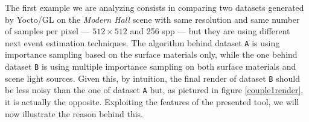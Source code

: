 The first example we are analyzing consists in comparing two datasets generated by Yocto/GL \cite{pellacini2019yocto} on the \textit{Modern Hall} scene \cite{bitterliscenes} with same resolution and same number of samples per pixel --- $512 \times 512$ and 256 spp --- but they are using different next event estimation techniques. The algorithm behind dataset \texttt{A} is using importance sampling based on the surface materials only, while the one behind dataset \texttt{B} is using multiple importance sampling on both surface materials and scene light sources. Given this, by intuition, the final render of dataset \texttt{B} should be less noisy than the one of dataset \texttt{A} but, as pictured in figure \ref{couple1render}, it is actually the opposite. Exploiting the features of the presented tool, we will now illustrate the reason behind this. 

